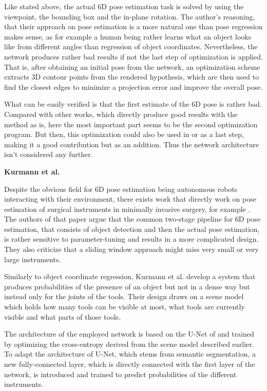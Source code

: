 Like stated above, the actual 6D pose estimation task is solved by using the viewpoint, the bounding box and the in-plane rotation. The author's reasoning, that their approach on pose estimation is a more natural one than pose regression makes sense, as for example a human being rather learns what an object looks like from different angles than regression of object coordinates. Nevertheless, the network produces rather bad results if not the last step of optimization is applied. That is, after obtaining an initial pose from the network, an optimization scheme extracts 3D contour points from the rendered hypothesis, which are then used to find the closest edges to minimize a projection error and improve the overall pose. 

What can be easily verified is that the first estimate of the 6D pose is rather bad. Compared with other works, which directly produce good results with the method as is, here the most important part seems to be the second optimization program. But then, this optimization could also be used in \cite{brachmann2} or \cite{bb8} as a last step, making it a good contribution but as an addition. Thus the network architecture isn't considered any further.

\quad \textbf{Kurmann et al.}

Despite the obvious field for 6D pose estimation being autonomous robots interacting with their environment, there exists work that directly work on pose estimation of surgical instruments in minimally invasive surgery, for example \cite{kurmann}. The authors of that paper argue that the common two-stage pipeline for 6D pose estimation, that consists of object detection and then the actual pose estimation, is rather sensitive to parameter-tuning and results in a more complicated design. They also criticize that a sliding window approach might miss very small or very large instruments. 

Similarly to object coordinate regression, Kurmann et al. develop a system that produces probabilities of the presence of an object but not in a dense way but instead only for the joints of the tools. Their design draws on a scene model which holds how many tools can be visible at most, what tools are currently visible and what parts of those tools. 

The architecture of the employed network is based on the U-Net of \cite{oronneberger} and trained by optimizing the cross-entropy derived from the scene model described earlier. To adapt the architecture of U-Net, which stems from semantic segmentation, a new fully-connected layer, which is directly connected with the first layer of the network, is introduced and trained to predict probabilities of the different instruments. 

